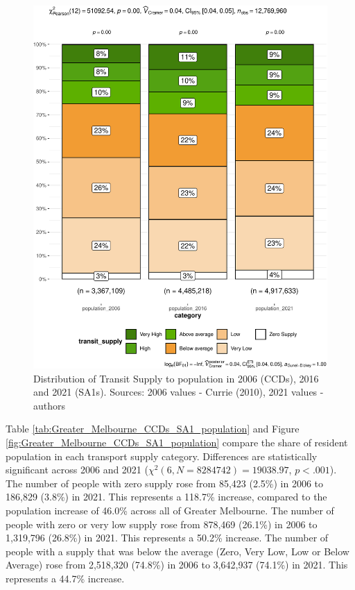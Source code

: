 \documentclass[preprint, 3p,
authoryear]{elsarticle} %
\begin{document}
\begin{figure}
\centering
\includegraphics{Leveraging_GTFS_to_assess_transit_supply_Transport_Geography_files/figure-latex/Greater_Melbourne_CCDs_SA1_population-1.pdf}
\caption{Distribution of Transit Supply to population in 2006 (CCDs),
2016 and 2021 (SA1s). Sources: 2006 values - Currie (2010), 2021 values
- authors}
\end{figure}

Table \ref{tab:Greater_Melbourne_CCDs_SA1_population} and Figure
\ref{fig:Greater_Melbourne_CCDs_SA1_population} compare the share of
resident population in each transport supply category. Differences are
statistically significant across 2006 and 2021
(\(\chi^2(6, N = 8284742) = 19038.97\), \(p < .001\)). The number of
people with zero supply rose from 85,423 (2.5\%) in 2006 to 186,829
(3.8\%) in 2021. This represents a 118.7\% increase, compared to the
population increase of 46.0\% across all of Greater Melbourne. The
number of people with zero or very low supply rose from 878,469 (26.1\%)
in 2006 to 1,319,796 (26.8\%) in 2021. This represents a 50.2\%
increase. The number of people with a supply that was below the average
(Zero, Very Low, Low or Below Average) rose from 2,518,320 (74.8\%) in
2006 to 3,642,937 (74.1\%) in 2021. This represents a 44.7\% increase.
\end{document}
